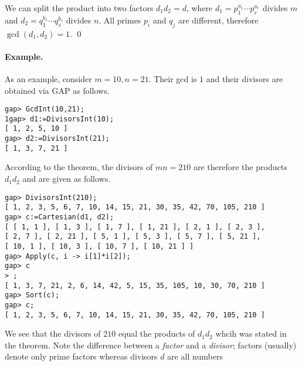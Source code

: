 We can split the product into two factors $d_1 d_2 = d$, where $d_1 = p_1^{a_1} \cdots p_r^{a_r}$ divides $m$ and $d_2 = q_1^{b_1} \cdots q_s^{b_s}$ divides $n$. All primes $p_i$ and $q_j$ are different, therefore $\gcd(d_1, d_2) = 1$. \qed

\paragraph{Example.} As an example, consider $m = 10, n = 21$. Their gcd is $1$ and their divisors are obtained via GAP as follows.

\begin{verbatim}
gap> GcdInt(10,21);
1gap> d1:=DivisorsInt(10);
[ 1, 2, 5, 10 ]
gap> d2:=DivisorsInt(21);
[ 1, 3, 7, 21 ]
\end{verbatim}

According to the theorem, the divisors of $mn = 210$ are therefore the products $d_1 d_2$ and are given as follows.

\begin{verbatim}
gap> DivisorsInt(210);
[ 1, 2, 3, 5, 6, 7, 10, 14, 15, 21, 30, 35, 42, 70, 105, 210 ]
gap> c:=Cartesian(d1, d2);
[ [ 1, 1 ], [ 1, 3 ], [ 1, 7 ], [ 1, 21 ], [ 2, 1 ], [ 2, 3 ], 
[ 2, 7 ], [ 2, 21 ], [ 5, 1 ], [ 5, 3 ], [ 5, 7 ], [ 5, 21 ], 
[ 10, 1 ], [ 10, 3 ], [ 10, 7 ], [ 10, 21 ] ]
gap> Apply(c, i -> i[1]*i[2]);
gap> c
> ;
[ 1, 3, 7, 21, 2, 6, 14, 42, 5, 15, 35, 105, 10, 30, 70, 210 ]
gap> Sort(c);
gap> c;
[ 1, 2, 3, 5, 6, 7, 10, 14, 15, 21, 30, 35, 42, 70, 105, 210 ]
\end{verbatim}

We see that the divisors of $210$ equal the products of $d_1 d_2$ whcih was stated in the theorem. Note the difference between a \emph{factor} and a \emph{divisor}; factors (usually) denote only prime factors whereas divisors $d$ are all numbers 


